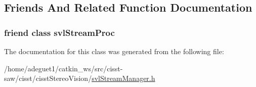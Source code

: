 \subsection{Friends And Related Function Documentation}
\hypertarget{classsvl_stream_manager_a6a9ee1dec5ca263793dca09411295245}{
\subsubsection[{svl\-Stream\-Proc}]{\setlength{\rightskip}{0pt plus 5cm}friend class {\bf svl\-Stream\-Proc}\hspace{0.3cm}{\ttfamily [friend]}}}\label{classsvl_stream_manager_a6a9ee1dec5ca263793dca09411295245}


The documentation for this class was generated from the following file\-:\begin{DoxyCompactItemize}
\item 
/home/adeguet1/catkin\-\_\-ws/src/cisst-\/saw/cisst/cisst\-Stereo\-Vision/\hyperlink{svl_stream_manager_8h}{svl\-Stream\-Manager.\-h}\end{DoxyCompactItemize}
